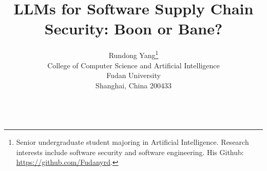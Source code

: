 \documentclass{article}
\title{LLMs for Software Supply Chain Security: Boon or Bane?}
\author{%
  Rundong Yang\thanks{
    Senior undergraduate student majoring in Artificial Intelligence. 
    Research interests include software security and software engineering.
    His Github: \url{https://github.com/Fudanyrd}.
  } \\
  College of Computer Science and Artificial Intelligence\\
  Fudan University\\
  Shanghai, China 200433 \\
  \href{mailto:\myemail}{\texttt{\myemail}} \\
}
\begin{document}
\maketitle
\begin{abstract}
  
\end{abstract}











{
\small

}
\end{document}
